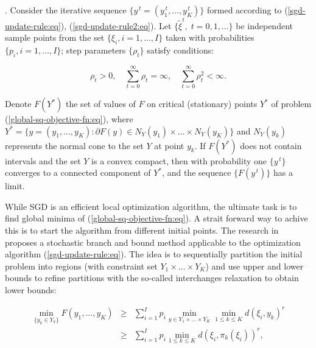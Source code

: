 \begin{theorem}
    \label{Theorem 1} \cite{Ermoliev_Norkin_2003,Ermolev_Norkin_1998}. Consider the iterative sequence $ \{ y^{\,t} = (y_1^{\,t}, \ldots, y_K^{\,t}) \} $ formed according to (\ref{sgd-update-rule:eq}), (\ref{sgd-update-rule2:eq}). Let $ \{ \tilde{\xi}^{t},\;t=0,1,\ldots\} $ be independent sample points from the set $ \{ \xi_i, i = 1, \ldots, I \} $ taken with probabilities $ \{ p_i, i = 1, \ldots, I \} $; step parameters $\{\rho_t\}$ satisfy conditions:

    \begin{equation}
        \label{sq-convergence-cond:eq}
            \rho_t > 0, \quad \sum_{t=0}^{\infty} \rho_t = \infty, \quad \sum_{t=0}^{\infty} \rho_t^2 < \infty.
    \end{equation}

    Denote $ F(Y^{*}) $ the set of values of $ F $ on critical (stationary) points $ Y^{*} $ of problem (\ref{global-sq-objective-fn:eq}), where $ Y^{*} = \{ y = (y_1, \ldots, y_K): \partial F(y) \in N_Y (y_1) \times \ldots \times N_Y (y_K) \} $ and $ N_Y (y_k) $ represents the normal cone to the set $ Y $ at point $ y_k $. If $ F(Y^{*}) $ does not contain intervals and the set $Y$ is a convex compact, then with probability one $ \{ y^{\,t} \} $ converges to a connected component of $ Y^{*} $, and the sequence $ \{ F(y^{\,t}) \} $ has a limit.
\end{theorem}

While SGD is an efficient local optimization algorithm, the ultimate task is to find global minima of (\ref{global-sq-objective-fn:eq}). A strait forward way to achive this is to start the algorithm from different initial points.  The research in \cite{Norkin_Pflug_Ruszczynski_1998} proposes a stochastic branch and bound method applicable to the optimization algorithm (\ref{sgd-update-rule:eq}). The idea is to sequentially partition the initial problem into regions (with constraint set $Y_1 \times \ldots \times Y_K$) and use upper and lower bounds to refine partitions with the so-called interchanges relaxation to obtain lower bounds:

\begin{eqnarray}
    \label{sq-branch-bound:eq}
				\min_{\{ y_k \in Y_k \}} F(y_1, \ldots, y_K)
        &\geq& \sum_{i=1}^I p_i \min_{y \in Y_1\times\ldots\times Y_K} \min_{1 \leq k \leq K} d(\xi_i, y_k)^r \nonumber\\
				&\geq& \sum_{i=1}^I p_i \min_{1 \leq k \leq K} d(\xi_i, \pi_k(\xi_i))^r, 
\end{eqnarray}

